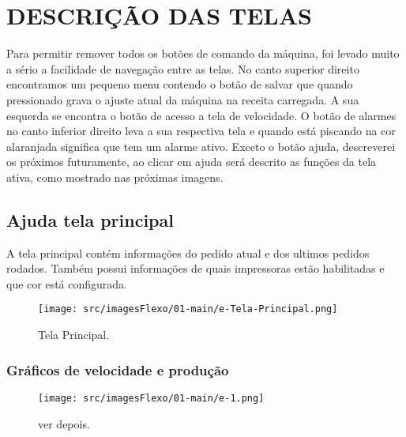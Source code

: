 \thispagestyle{fancy}

\vspace*{\fill}

\section{\MakeUppercase{\large{Descrição das telas}}}

Para permitir remover todos os botões de comando da máquina, foi levado muito a sério a facilidade de navegação entre as telas.
No canto superior direito encontramos um pequeno menu contendo o botão de salvar que quando pressionado grava o ajuste atual da máquina na receita carregada. A sua esquerda se encontra o botão de acesso a tela de velocidade. O botão de alarmes no canto inferior direito leva a sua respectiva tela e quando está piscando na cor alaranjada significa que tem um alarme ativo. Exceto o botão ajuda, descreverei os próximos futuramente, ao clicar em ajuda será descrito as funções da tela ativa, como mostrado nas próximas imagens.

\subsection{Ajuda tela principal}

A tela principal contém informações do pedido atual e dos ultimos pedidos rodados. Também
possui informações de quais impressoras estão habilitadas e que cor está configurada.

\begin{figure}[h]
  \centering
  \texttt{[image: src/imagesFlexo/01-main/e-Tela-Principal.png]}
  \caption{Tela Principal.}
   \label{}
\end{figure}

\newpage
\thispagestyle{fancy}

\vspace*{\fill}

\subsubsection{\small{Gráficos de velocidade e produção}}


\begin{figure}[h]
  \centering
  \texttt{[image: src/imagesFlexo/01-main/e-1.png]}
  \caption{ver depois.}
   \label{}
\end{figure}

\vspace*{\fill}

